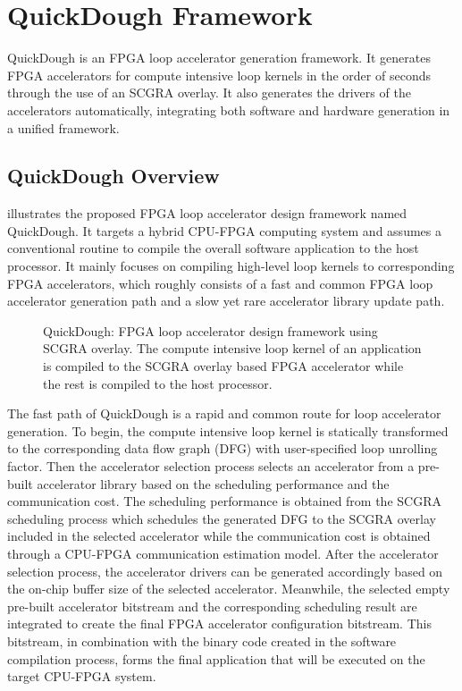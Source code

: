 \section{QuickDough Framework}\label{sec:framework}
QuickDough is an FPGA loop accelerator generation framework. It generates FPGA accelerators for compute intensive loop kernels in the order of seconds through the use of an SCGRA overlay. It also generates the drivers of the accelerators automatically, integrating both software and hardware generation in a unified framework.

\subsection{QuickDough Overview}
 illustrates the proposed FPGA loop accelerator design framework named QuickDough. It targets a hybrid CPU-FPGA computing system and assumes a conventional routine to compile the overall software application to the host processor. It mainly focuses on compiling high-level loop kernels to corresponding FPGA accelerators, which roughly consists of a fast and common FPGA loop accelerator generation path and a slow yet rare accelerator library update path.

\begin{figure}[bt]
\vspace{-1em}
    \caption{QuickDough: FPGA loop accelerator design framework using 
        SCGRA overlay. The compute intensive loop kernel of an 
        application is compiled to the SCGRA overlay based FPGA
    accelerator while the rest is compiled to the host processor.}
    \label{fig:framework}
\vspace{-1em}
\end{figure}

The fast path of QuickDough is a rapid and common route for loop accelerator generation. To begin, the compute intensive loop kernel is statically transformed to the corresponding data flow graph (DFG) with user-specified loop unrolling factor. Then the accelerator selection process selects an accelerator from a pre-built accelerator library based on the scheduling performance and the communication cost. The scheduling performance is obtained from the SCGRA scheduling process which schedules the generated DFG to the SCGRA overlay included in the selected accelerator while the communication cost is obtained through a CPU-FPGA communication estimation model. After the accelerator selection
process, the accelerator drivers can be generated accordingly based on the on-chip buffer size of the selected accelerator. Meanwhile, the selected empty pre-built accelerator bitstream and the corresponding scheduling result are integrated to create the final FPGA accelerator configuration bitstream. This bitstream, in combination with the binary code created in the software compilation process, forms the final application that will be executed on the target CPU-FPGA system.

